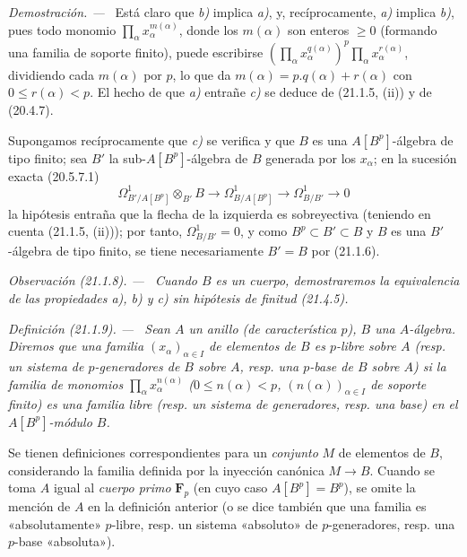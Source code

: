 \documentclass[10pt,oneside]{book}
\makeatletter
\newcommand{\setmanualcurrentlabel}[1]{\def\@currentlabel{#1}}
\newenvironment{definition}[1][]{%
  \setmanualcurrentlabel{#1}\par\medskip\noindent\itshape Definición (#1). ---\ }{\par}
\newenvironment{remark}[1][]{%
  \setmanualcurrentlabel{#1}\par\medskip\noindent\itshape Observación (#1). ---\ }{\par}
\newenvironment{proof}{%
  \par\medskip\noindent\textit{Demostración. ---\ }}{\par}
\makeatother
\begin{document}
\begin{proof}
Está claro que \emph{b)} implica \emph{a)}, y, recíprocamente, \emph{a)} implica \emph{b)}, pues todo
monomio $\prod_\alpha x_\alpha^{m(\alpha)}$, donde los $m(\alpha)$ son
enteros $\geq0$ (formando una familia de soporte finito), puede escribirse
$(\prod_\alpha x_\alpha^{q(\alpha)})^p\prod_\alpha x_\alpha^{r(\alpha)}$,
dividiendo cada $m(\alpha)$ por $p$, lo que da
$m(\alpha)=p.q(\alpha)+r(\alpha)$ con $0\leq r(\alpha)<p$.
El hecho de que \emph{a)} entrañe \emph{c)} se deduce de (21.1.5, (ii)) y de (20.4.7).

Supongamos recíprocamente que \emph{c)} se verifica y que $B$ es una
$A[B^p]$-álgebra de tipo finito; sea $B'$ la sub-$A[B^p]$-álgebra de $B$
generada por los $x_\alpha$; en la sucesión exacta (20.5.7.1)
\[
\Omega^1_{B'/A[B^p]}\otimes_{B'}B\longrightarrow
\Omega^1_{B/A[B^p]}\longrightarrow\Omega^1_{B/B'}\longrightarrow0
\]
la hipótesis entraña que la flecha de la izquierda es sobreyectiva (teniendo
en cuenta (21.1.5, (ii))); por tanto, $\Omega^1_{B/B'}=0$, y como
$B^p\subset B'\subset B$ y $B$ es una $B'$-álgebra de tipo finito, se tiene
necesariamente $B'=B$ por (21.1.6).
\end{proof}

\begin{remark}[21.1.8]
\label{0.21.1.8-es}
Cuando $B$ es un \emph{cuerpo}, demostraremos la equivalencia de las propiedades \emph{a)},
\emph{b)} y \emph{c)} sin hipótesis de finitud (21.4.5).
\end{remark}

\begin{definition}[21.1.9]
\label{0.21.1.9-es}
Sean $A$ un anillo (de característica $p$), $B$ una $A$-álgebra. Diremos
que una familia $(x_\alpha)_{\alpha\in I}$ de elementos de $B$ es
$p$-libre sobre $A$ (\textup{resp.} un sistema de $p$-generadores de $B$ sobre $A$,
\textup{resp.} una $p$-base de $B$ sobre $A$) si la familia de monomios
$\prod_\alpha x_\alpha^{n(\alpha)}$ ($0\leq n(\alpha)<p$,
$(n(\alpha))_{\alpha\in I}$ de soporte finito) es una familia libre (\textup{resp.}
un sistema de generadores, \textup{resp.} una base) en el $A[B^p]$-módulo $B$.
\end{definition}

Se tienen definiciones correspondientes para un \emph{conjunto} $M$ de elementos de
$B$, considerando la familia definida por la inyección canónica $M\to B$.
Cuando se toma $A$ igual al \emph{cuerpo primo} $\mathbf F_p$ (en cuyo caso
$A[B^p]=B^p$), se omite la mención de $A$ en la definición anterior (o se
dice también que una familia es «absolutamente» $p$-libre, resp. un sistema
«absoluto» de $p$-generadores, resp. una $p$-base «absoluta»).
\end{document}
